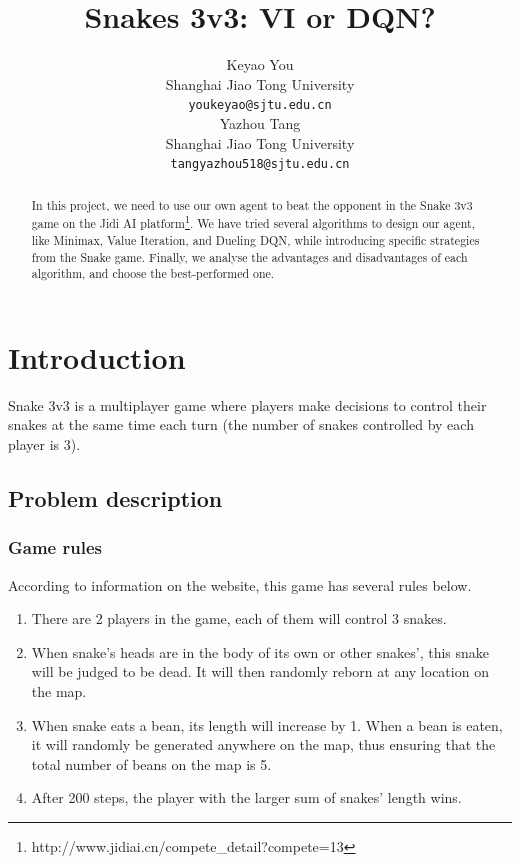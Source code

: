 \documentclass{article}
\title{Snakes 3v3: VI or DQN?}
\author{%
  Keyao You \\
  Shanghai Jiao Tong University \\
  \texttt{youkeyao@sjtu.edu.cn} \\
   \And
   Yazhou Tang \\
   Shanghai Jiao Tong University \\
   \texttt{tangyazhou518@sjtu.edu.cn} \\
}
\begin{document}
\maketitle

\begin{abstract}
  In this project, we need to use our own agent to beat the opponent in the Snake 3v3 game on the Jidi AI platform\footnote{http://www.jidiai.cn/compete\_detail?compete=13}. We have tried several algorithms to design our agent, like Minimax, Value Iteration, and Dueling DQN, while introducing specific strategies from the Snake game. Finally, we analyse the advantages and disadvantages of each algorithm, and choose the best-performed one.
  
\end{abstract}

\section{Introduction}

Snake 3v3 is a multiplayer game where players make decisions to control their snakes at the same time each turn (the number of snakes controlled by each player is 3).

\subsection{Problem description}

\subsubsection{Game rules}

According to information on the website, this game has several rules below.

\begin{enumerate}
    \item There are 2 players in the game, each of them will control 3 snakes.
    \item When snake's heads are in the body of its own or other snakes', this snake will be judged to be dead. It will then randomly reborn at any location on the map.
    \item When snake eats a bean, its length will increase by 1. When a bean is eaten, it will randomly be generated anywhere on the map, thus ensuring that the total number of beans on the map is 5.
    \item After 200 steps, the player with the larger sum of snakes' length wins.
\end{enumerate}
\end{document}
